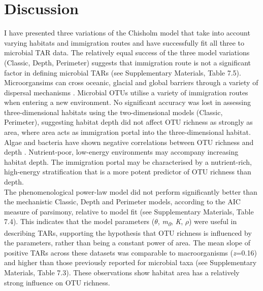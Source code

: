 \chapter{Discussion}

I have presented three variations of the Chisholm model \cite{chisholm2016maintenance} that take into account varying habitats and immigration routes and have successfully fit all three to microbial TAR data. The relatively equal success of the three model variations (Classic, Depth, Perimeter) suggests that immigration route is not a significant factor in defining microbial TARs (see Supplementary Materials, Table 7.5).  Microorgansims can cross oceanic, glacial and global barriers through a variety of dispersal mechanisms \cite{rosselli2015microbial} \cite{darcy2018island} \cite{kleinteich2017pole}. Microbial OTUs utilise a variety of immigration routes when entering a new environment. No significant accuracy was lost in assessing three-dimensional habitats using the two-dimensional models (Classic, Perimeter), suggesting habitat depth did not affect OTU richness as strongly as area, where area acts as immigration portal into the three-dimensional habitat. Algae and bacteria have shown negative correlations between OTU richness and depth \cite{battes2019species} \cite{turner2017microbial}. Nutrient-poor, low-energy environments may accompany increasing habitat depth. The immigration portal may be characterised by a nutrient-rich, high-energy stratification that is a more potent predictor of OTU richness than depth. \\

\noindent The phenomenological power-law model did not perform significantly better than the mechanistic Classic, Depth and Perimeter models, according to the AIC measure of parsimony, relative to model fit (see Supplementary Materials, Table 7.4). This indicates that the model parameters ($\theta$, \textit{m\textsubscript{0}}, \textit{K}, $\rho$) were useful in describing TARs, supporting the hypothesis that OTU richness is influenced by the parameters, rather than being a constant power of area. The mean slope of positive TARs across these datasets was comparable to macroorganisms (\textit{z}=0.16) and higher than those previously reported for microbial taxa \cite{rosenzweig1995species} \cite{green2004spatial} (see Supplementary Materials, Table 7.3). These observations show habitat area has a relatively strong influence on OTU richness.  \\

